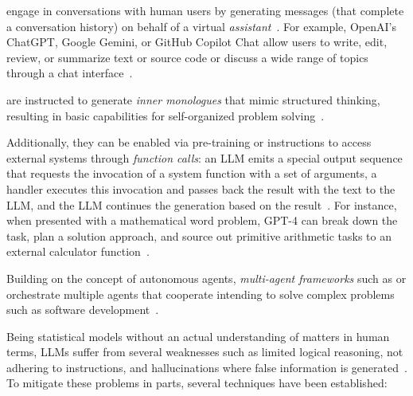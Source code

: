 \begin{description}[noextralabelsep]
	\item[Conversational agents] engage in conversations with human users by generating messages (that complete a conversation history) on behalf of a virtual \emph{assistant}~\cite{bai2022training}.
	For example, OpenAI's ChatGPT, Google Gemini, or GitHub Copilot Chat allow users to write, edit, review, or summarize text or source code or discuss a wide range of topics through a chat interface~\cite{openai2024gpt4}.

	\item[Autonomous agents] are instructed to generate \emph{inner monologues} that mimic structured thinking, resulting in basic capabilities for self-organized problem solving~\cite{yang2023autogpt}.

	Additionally, they can be enabled via pre-training or instructions to access external systems through \emph{function calls}: an LLM emits a special output sequence that requests the invocation of a system function with a set of arguments, a handler executes this invocation and passes back the result with the text to the LLM, and the LLM continues the generation based on the result~\cite{hao2023toolkengpt,mialon2023augmented,yang2023autogpt}.
	For instance, when presented with a mathematical word problem, GPT-4 can break down the task, plan a solution approach, and source out primitive arithmetic tasks to an external calculator function~\cite{openai2024gpt4}.

	Building on the concept of autonomous agents, \emph{multi-agent frameworks} such as  or  orchestrate multiple agents that cooperate intending to solve complex problems such as software development~\cite{hong2023metagpt,qian2023communicative}.
\end{description}

Being statistical models without an actual understanding of matters in human terms, LLMs suffer from several weaknesses such as limited logical reasoning, not adhering to instructions, and hallucinations where false information is generated~\cite{openai2024gpt4}.
To mitigate these problems in parts, several techniques have been established:

